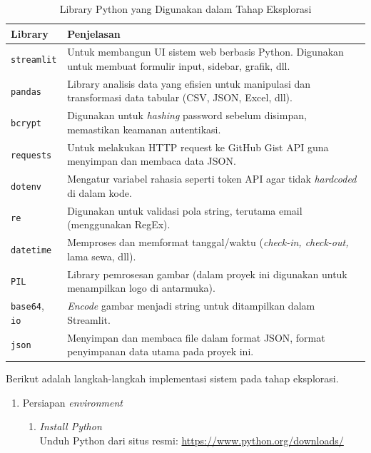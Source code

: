 \begin{enumerate}
    \begin{table}[H]
        \centering
        \caption{Library Python yang Digunakan dalam Tahap Eksplorasi}
        \label{tab:python_libs}
        \begin{tabular}{|l|p{11cm}|}
        \hline
        \textbf{Library} & \textbf{Penjelasan} \\
        \hline
        \texttt{streamlit} & Untuk membangun UI sistem web berbasis Python. Digunakan untuk membuat formulir input, sidebar, grafik, dll. \\
        \hline
        \texttt{pandas} & Library analisis data yang efisien untuk manipulasi dan transformasi data tabular (CSV, JSON, Excel, dll). \\
        \hline
        \texttt{bcrypt} & Digunakan untuk \textit{hashing} password sebelum disimpan, memastikan keamanan autentikasi. \\
        \hline
        \texttt{requests} & Untuk melakukan HTTP request ke GitHub Gist API guna menyimpan dan membaca data JSON. \\
        \hline
        \texttt{dotenv} & Mengatur variabel rahasia seperti token API agar tidak \textit{hardcoded} di dalam kode. \\
        \hline
        \texttt{re} & Digunakan untuk validasi pola string, terutama email (menggunakan RegEx). \\
        \hline
        \texttt{datetime} & Memproses dan memformat tanggal/waktu (\textit{check-in, check-out,} lama sewa, dll). \\
        \hline
        \texttt{PIL} & Library pemrosesan gambar (dalam proyek ini digunakan untuk menampilkan logo di antarmuka). \\
        \hline
        \texttt{base64}, \texttt{io} & \textit{Encode} gambar menjadi string untuk ditampilkan dalam Streamlit. \\
        \hline
        \texttt{json} & Menyimpan dan membaca file dalam format JSON, format penyimpanan data utama pada proyek ini. \\
        \hline
        \end{tabular}
    \end{table}
    
    Berikut adalah langkah-langkah implementasi sistem \textit{} pada tahap eksplorasi.

    \begin{enumerate}
      \item {Persiapan \textit{environment}}
      \begin{enumerate}
        \item \textit{Install Python}\\
        Unduh Python dari situs resmi: \url{https://www.python.org/downloads/}
        

\end{enumerate}
\end{enumerate}
\end{enumerate}
